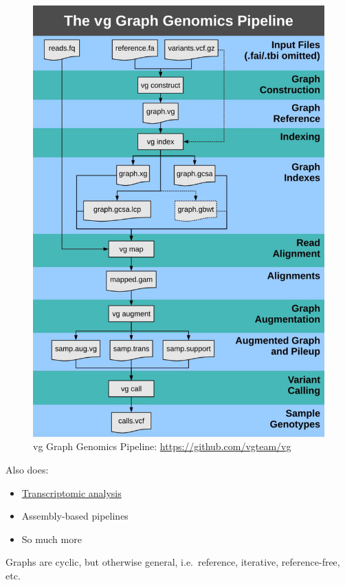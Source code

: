 \documentclass[
]{book}
\providecommand{\tightlist}{%
  \setlength{\itemsep}{0pt}\setlength{\parskip}{0pt}}
\begin{document}
\begin{figure}
\centering
\includegraphics[width=1\textwidth,height=\textheight]{./Figures/VGpipe.png}
\caption{vg Graph Genomics Pipeline: \url{https://github.com/vgteam/vg}}
\end{figure}

Also does:

\begin{itemize}
\tightlist
\item
  \href{https://github.com/vgteam/vg\#transcriptomic-analysis}{Transcriptomic analysis}
\item
  Assembly-based pipelines
\item
  So much more
\end{itemize}

Graphs are cyclic, but otherwise general, i.e.~reference, iterative, reference-free, etc.
\end{document}
